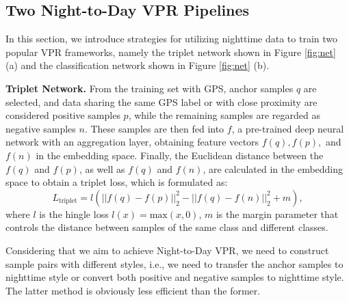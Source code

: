 \documentclass[10pt,twocolumn,letterpaper]{article}
\begin{document}
\subsection{Two Night-to-Day VPR Pipelines}
\label{pipelines}

In this section, we introduce strategies for utilizing nighttime data to train two popular VPR frameworks, namely the triplet network shown in Figure \ref{fig:net} (a) and the classification network shown in Figure \ref{fig:net} (b).

\noindent \textbf{Triplet Network.} From the training set with GPS, anchor samples $q$ are selected, and data sharing the same GPS label or with close proximity are considered positive samples $p$, while the remaining samples are regarded as negative samples $n$. These samples are then fed into $f$, a pre-trained deep neural network with an aggregation layer, obtaining feature vectors $f(q), f(p),$ and $f(n)$ in the embedding space. Finally, the Euclidean distance between the $f(q)$ and $f(p)$, as well as $f(q)$ and $f(n)$, are calculated in the embedding space to obtain a triplet loss, which is formulated as:
\begin{equation}
L_{\mathrm{triplet}} = l(||f(q)-f(p)||_2^2 - ||f(q)-f(n)||_2^2 + m),
\end{equation}
where $l$ is the hingle loss $l(x) = \mathrm{max}(x, 0)$, $m$ is the margin parameter that controls the distance between samples of the same class and different classes.

Considering that we aim to achieve Night-to-Day VPR, we need to construct sample pairs with different styles, i.e., we need to transfer the anchor samples to nighttime style or convert both positive and negative samples to nighttime style. The latter method is obviously less efficient than the former.
\end{document}
